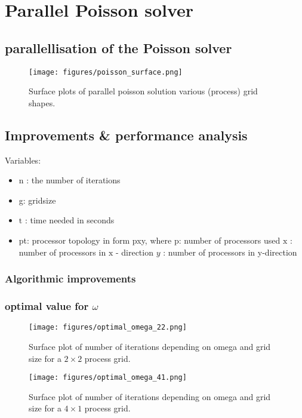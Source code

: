 \section{Parallel Poisson solver}

\subsection{parallellisation of the Poisson solver}
\begin{figure}[H]
    \centering
    \texttt{[image: figures/poisson\_surface.png]}
    \caption{Surface plots of parallel poisson solution various (process) grid shapes.}
    \label{fig:ppoisson_surface}
\end{figure}

\subsection{Improvements \& performance analysis}
Variables:
\begin{itemize}
    \item $\mathrm{n}$ : the number of iterations
    \item g: gridsize
    \item $\mathrm{t}$ : time needed in seconds
    \item pt: processor topology in form pxy, where p: number of processors used $\mathrm{x}$ : number of processors in $\mathrm{x}$ - direction $y$ : number of processors in y-direction
\end{itemize}

\subsubsection{Algorithmic improvements}

\subsubsection{optimal value for $\omega$}
\begin{figure}[H]
    \centering
    \texttt{[image: figures/optimal\_omega\_22.png]}
    \caption{Surface plot of number of iterations depending on omega and grid size for a $2\times2$ process grid.}
    \label{fig:optimal_omega_22}
\end{figure}

\begin{figure}[H]
    \centering
    \texttt{[image: figures/optimal\_omega\_41.png]}
    \caption{Surface plot of number of iterations depending on omega and grid size for a $4\times1$ process grid.}
    \label{fig:optimal_omega_41}
\end{figure}

